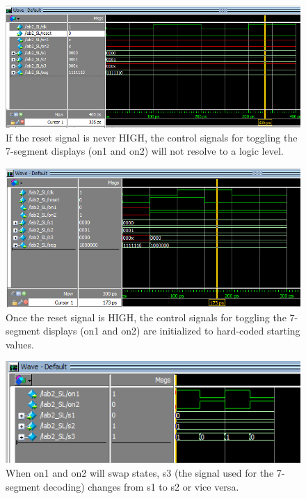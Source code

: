 \documentclass[11pt]{article}
\begin{document}
\begin{figure}[h!]
\centering
\includegraphics[scale=0.75]{no_reset.png}
\caption{If the reset signal is never HIGH, the control signals for toggling the 7-segment displays (on1 and on2) will not resolve to a logic level.}
\label{fig:wave_reset_no}
\end{figure} 


\begin{figure}[h!]
\centering
\includegraphics[scale=0.8]{yes_reset.png}
\caption{Once the reset signal is HIGH, the control signals for toggling the 7-segment displays (on1 and on2) are initialized to hard-coded starting values.}
\label{fig:wave_reset_yes}
\end{figure}


\begin{figure}[h!]
\centering
\includegraphics[scale=1]{toggling.png}
\caption{When on1 and on2 will swap states, s3 (the signal used for the 7-segment decoding) changes from s1 to s2 or vice versa.}
\label{fig:wave_toggle}
\end{figure}
\end{document}
